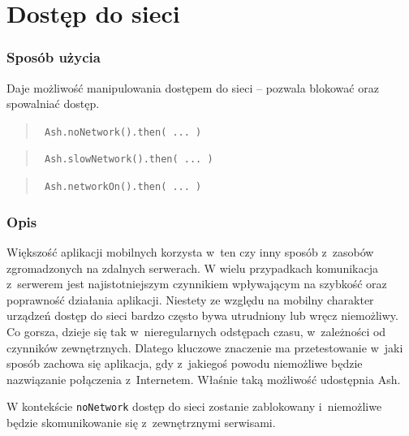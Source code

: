 \documentclass[brudnopis]{xmgr}
\begin{document}
\section{Dostęp do sieci}

\subsubsection{Sposób użycia}

Daje możliwość manipulowania dostępem do sieci -- pozwala blokować oraz spowalniać dostęp.

\begin{quote}
  \texttt{  Ash.noNetwork().then( ... )  } 
\end{quote}

\begin{quote}
  \texttt{  Ash.slowNetwork().then( ... )  }
\end{quote}

\begin{quote}
  \texttt{  Ash.networkOn().then( ... )  } 
\end{quote}

\subsubsection{Opis}

Większość aplikacji mobilnych korzysta w~ten czy inny sposób z~zasobów zgromadzonych na zdalnych serwerach. W wielu przypadkach komunikacja z~serwerem jest najistotniejszym czynnikiem wpływającym na szybkość oraz poprawność działania aplikacji. Niestety ze względu na mobilny charakter urządzeń dostęp do sieci bardzo często bywa utrudniony lub wręcz niemożliwy. Co gorsza, dzieje się tak w~nieregularnych odstępach czasu, w~zależności od czynników zewnętrznych. Dlatego kluczowe znaczenie ma przetestowanie w~jaki sposób zachowa się aplikacja, gdy z~jakiegoś powodu niemożliwe będzie nazwiązanie połączenia z~Internetem. Właśnie taką możliwość udostępnia Ash. 


W kontekście \texttt{noNetwork} dostęp do sieci zostanie zablokowany i~niemożliwe będzie skomunikowanie się z~zewnętrznymi serwisami.
\end{document}
